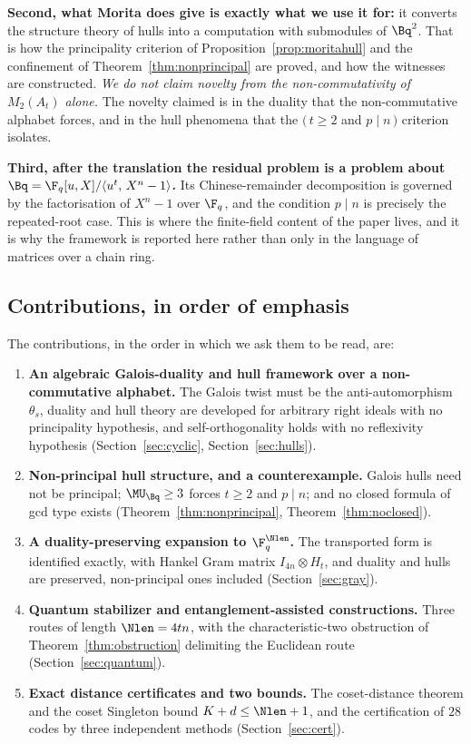 \textbf{Second, what Morita does give is exactly what we use it for:} it
converts the structure theory of hulls into a computation with submodules of
$\Bq^2$. That is how the principality criterion of
Proposition~\ref{prop:moritahull} and the confinement of
Theorem~\ref{thm:nonprincipal} are proved, and how the witnesses are
constructed. \emph{We do not claim novelty from the non-commutativity of
$M_2(A_t)$ alone.} The novelty claimed is in the duality that the
non-commutative alphabet forces, and in the hull phenomena that the
$(\,t\ge2$ and $p\mid n\,)$ criterion isolates.

\textbf{Third, after the translation the residual problem is a problem about
$\Bq=\F_q[u,X]/\langle u^t,\,X^n-1\rangle$.} Its Chinese-remainder
decomposition is governed by the factorisation of $X^n-1$ over $\F_q$, and the
condition $p\mid n$ is precisely the repeated-root case. This is where the
finite-field content of the paper lives, and it is why the framework is
reported here rather than only in the language of matrices over a chain ring.

\subsection{Contributions, in order of emphasis}
\label{subsec:contributions}

The contributions, in the order in which we ask them to be read, are:

\begin{enumerate}
\item \textbf{An algebraic Galois-duality and hull framework over a
  non-commutative alphabet.} The Galois twist must be the anti-automorphism
  $\theta_s$, duality and hull theory are developed for arbitrary right ideals
  with no principality hypothesis, and self-orthogonality holds with no
  reflexivity hypothesis (Section~\ref{sec:cyclic}, Section~\ref{sec:hulls}).
\item \textbf{Non-principal hull structure, and a counterexample.} Galois
  hulls need not be principal; $\MU_{\Bq}\ge3$ forces $t\ge2$ and $p\mid n$;
  and no closed formula of gcd type exists
  (Theorem~\ref{thm:nonprincipal}, Theorem~\ref{thm:noclosed}).
\item \textbf{A duality-preserving expansion to $\F_q^{\Nlen}$.} The
  transported form is identified exactly, with Hankel Gram matrix
  $I_{4n}\otimes H_t$, and duality and hulls are preserved, non-principal ones
  included (Section~\ref{sec:gray}).
\item \textbf{Quantum stabilizer and entanglement-assisted constructions.}
  Three routes of length $\Nlen=4tn$, with the characteristic-two obstruction
  of Theorem~\ref{thm:obstruction} delimiting the Euclidean route
  (Section~\ref{sec:quantum}).
\item \textbf{Exact distance certificates and two bounds.} The coset-distance
  theorem and the coset Singleton bound $K+d\le\Nlen+1$, and the certification
  of $28$ codes by three independent methods
  (Section~\ref{sec:cert}).
\end{enumerate}

